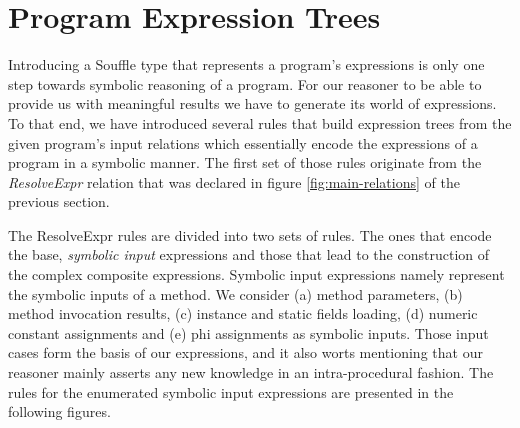 \section{Program Expression Trees}\label{s:pets}


Introducing a Souffle type that represents a program's expressions is only one
step towards symbolic reasoning of a program. For our reasoner to be able to provide us
with meaningful results we have to generate its world of expressions. To that end, we
have introduced several rules that build expression trees from the given program's
input relations which essentially encode the expressions of a program in a symbolic
manner. The first set of those rules originate from the \emph{ResolveExpr} relation
that was declared in figure \ref{fig:main-relations} of the previous section.

The ResolveExpr rules are divided into two sets of rules. The ones that encode
the base, \emph{symbolic input} expressions and those that lead to the construction of the
complex composite expressions. Symbolic input expressions namely represent the
symbolic inputs of a method. We consider (a) method parameters, (b) method invocation
results, (c) instance and static fields loading, (d) numeric constant assignments and
(e) phi assignments as symbolic inputs. Those input cases form the basis of our
expressions, and it also worts mentioning that our reasoner mainly asserts any new
knowledge in an intra-procedural fashion. The rules for the enumerated symbolic
input expressions are presented in the following figures.

